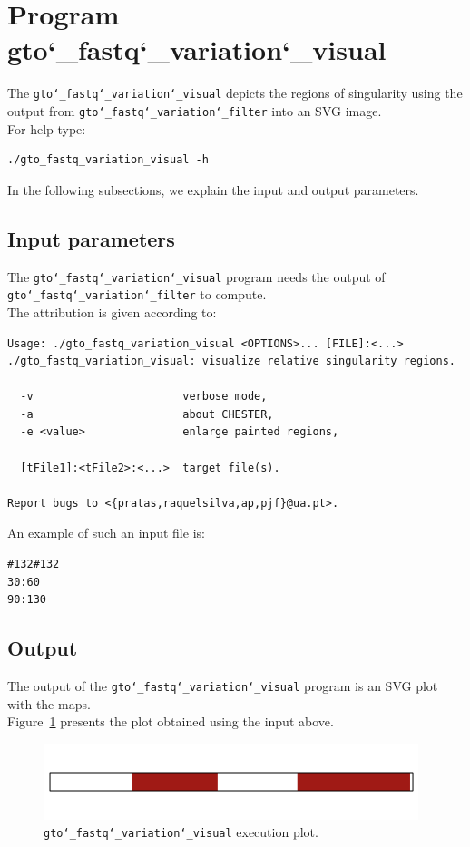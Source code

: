 \section{Program gto\char`_fastq\char`_variation\char`_visual}
The \texttt{gto\char`_fastq\char`_variation\char`_visual} depicts the regions of singularity using the output from \texttt{gto\char`_fastq\char`_variation\char`_filter} into an SVG image.\\
For help type:
\begin{lstlisting}
./gto_fastq_variation_visual -h
\end{lstlisting}
In the following subsections, we explain the input and output parameters.

\subsection*{Input parameters}

The \texttt{gto\char`_fastq\char`_variation\char`_visual} program needs the output of \texttt{gto\char`_fastq\char`_variation\char`_filter} to compute.\\
The attribution is given according to:
\begin{lstlisting}
Usage: ./gto_fastq_variation_visual <OPTIONS>... [FILE]:<...>
./gto_fastq_variation_visual: visualize relative singularity regions.
                                                     
  -v                       verbose mode,             
  -a                       about CHESTER,            
  -e <value>               enlarge painted regions,  
                                                     
  [tFile1]:<tFile2>:<...>  target file(s).           
                                                     
Report bugs to <{pratas,raquelsilva,ap,pjf}@ua.pt>. 
\end{lstlisting}
An example of such an input file is:
\begin{lstlisting}
#132#132
30:60
90:130
\end{lstlisting}

\subsection*{Output}
The output of the \texttt{gto\char`_fastq\char`_variation\char`_visual} program is an SVG plot with the maps.\\
Figure~\ref{fig:gtoFastqVariationVisual} presents the plot obtained using the input above.

\begin{figure}[!h]
\centering
\includegraphics[scale=0.6]{./images/gto_fastq_variation_visual.png}
\caption{\texttt{gto\char`_fastq\char`_variation\char`_visual} execution plot.}
\label{fig:gtoFastqVariationVisual}
\end{figure}